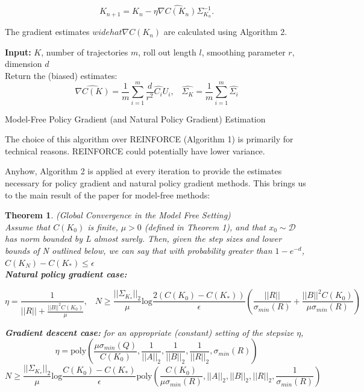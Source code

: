 \documentclass{article}[12pt]
\newtheorem{theorem}{Theorem}
\begin{document}
$$K_{n+1} = K_n -\eta \widehat{\nabla C(K_n)}\Sigma_{K_n}^{-1}.$$

The gradient estimates $widehat{\nabla C(K_n)}$ are calculated using Algorithm 2. 

\begin{algorithm}[H]
\SetAlgoLined
\textbf{Input:} $K$, number of trajectories $m$, roll out length $l$, smoothing parameter $r$, dimension $d$\\
  Return the (biased) estimates:
  $$\widehat{\nabla C(K)} = \frac{1}{m}\sum_{i = 1}^m \frac{d}{r^2}\hat{C_i}U_i, \; \; \; \widehat{\Sigma_K} = \frac{1}{m}\sum_{i = 1}^m\hat{\Sigma_i}$$
 \caption{Model-Free Policy Gradient (and Natural Policy Gradient) Estimation}
\end{algorithm}

The choice of this algorithm over REINFORCE (Algorithm 1) is primarily for technical reasons. REINFORCE could potentially have lower variance. 

Anyhow, Algorithm 2 is applied at every iteration to provide the estimates necessary for policy gradient and natural policy gradient methods. This brings us to the main result of the paper for model-free methods:

\begin{theorem} (Global Convergence in the Model Free Setting)\\
Assume that $C(K_0)$ is finite, $\mu>0$ (defined in Theorem 1), and that $x_0 \sim \mathcal{D}$ has norm bounded by L almost surely. Then, given the step sizes and lower bounds of N outlined below, we can say that with probability greater than $1-e^{-d}$, $C(K_N) - C(K_*)\leq \epsilon$\\

\textbf{Natural policy gradient case:}

$$\eta = \frac{1}{||R|| + \frac{||B||^2C(K_0)}{\mu}}, \; \; \; N \geq \frac{||\Sigma_{K_*}||_2}{\mu}\text{log}\frac{2(C(K_0)-C(K_*))}{\epsilon} \left(\frac{||R||}{\sigma_{min}(R)}+\frac{||B||^2C(K_0)}{\mu \sigma_{min}(R)}\right)$$

\textbf{Gradient descent case:} for an appropriate (constant) setting of the stepsize $\eta$,
$$\eta = \text{poly}\left(\frac{\mu \sigma_{min}(Q)}{C(K_0)},\frac{1}{||A||_2},\frac{1}{||B||_2},\frac{1}{||R||_2},\sigma_{min}(R)\right)$$
$$N \geq \frac{||\Sigma_{K_*}||_2}{\mu}\text{log}\frac{C(K_0)-C(K_*)}{\epsilon} \text{poly}\left(\frac{C(K_0)}{\mu \sigma_{min}(R)},||A||_2,||B||_2,||R||_2,\frac{1}{\sigma_{min}(R)}\right)$$

\end{theorem}
\end{document}
